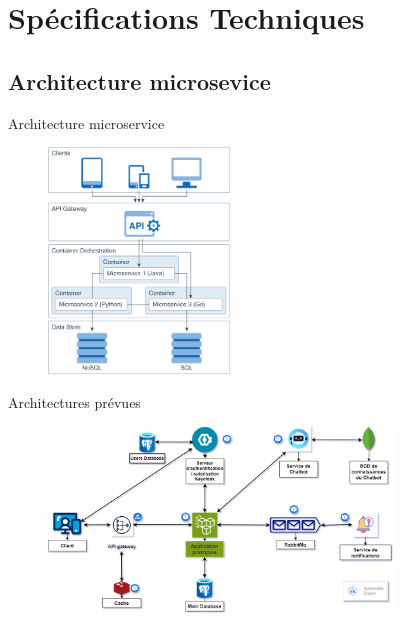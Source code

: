 \documentclass[aspectratio=169]{beamer}
\begin{document}
\section{Spécifications Techniques}



\subsection{Architecture microsevice}



\begin{frame}{Architecture microservice}
    \begin{figure}[htpb]
        \centering
        \includegraphics[height=6cm]{pic/microservice_architecture_presentation.png}
    \end{figure}
\end{frame}


\begin{frame}{Architectures prévues}
    \begin{figure}[htpb]
        \centering
        \includegraphics[height=5cm]{pic/Code212_architecture.drawio (1).png}
    \end{figure}
\end{frame}
\end{document}
